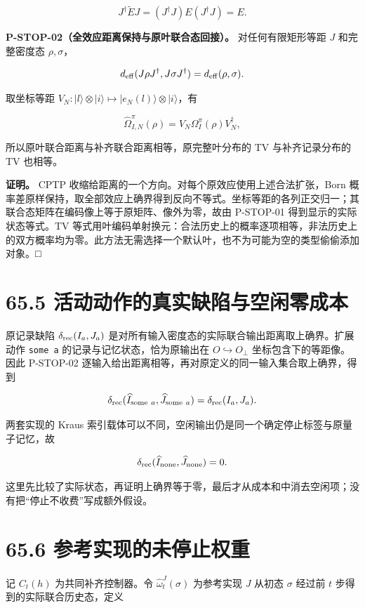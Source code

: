 \documentclass[
  11pt,
  oneside]{book}
\begin{document}
\[
J^\dagger\widetilde E J
=(J^\dagger J)E(J^\dagger J)=E.
\]

\protect\hypertarget{p-stop-02}{}{}

\textbf{P-STOP-02（全效应距离保持与原叶联合态回接）。}
对任何有限矩形等距 \(J\) 和完整密度态 \(\rho,\sigma\)，

\[
d_{\rm eff}(J\rho J^\dagger,J\sigma J^\dagger)
=d_{\rm eff}(\rho,\sigma).
\]

取坐标等距
\(V_N:|l\rangle\otimes|i\rangle\mapsto|e_N(l)\rangle\otimes|i\rangle\)，有

\[
\widehat\Omega_{I,N}^\pi(\rho)
=V_N\Omega_I^\pi(\rho)V_N^\dagger,
\]

所以原叶联合距离与补齐联合距离相等，原完整叶分布的 TV 与补齐记录分布的
TV 也相等。

\textbf{证明。} CPTP
收缩给距离的一个方向。对每个原效应使用上述合法扩张，Born
概率差原样保持，取全部效应上确界得到反向不等式。坐标等距的各列正交归一；其联合态矩阵在编码像上等于原矩阵、像外为零，故由
P-STOP-01 得到显示的实际状态等式。TV
等式用叶编码单射换元：合法历史上的概率逐项相等，非法历史上的双方概率均为零。此方法无需选择一个默认叶，也不为可能为空的类型偷偷添加对象。□

\section{65.5 活动动作的真实缺陷与空闲零成本}

原记录缺陷 \(\delta_{\rm rec}(I_a,J_a)\)
是对所有输入密度态的实际联合输出距离取上确界。扩展动作 \texttt{some\ a}
的记录与记忆状态，恰为原输出在 \(O\hookrightarrow O_\bot\)
坐标包含下的等距像。因此 P-STOP-02
逐输入给出距离相等，再对原定义的同一输入集合取上确界，得到

\[
\delta_{\rm rec}(\widehat I_{\mathrm{some}\ a},
\widehat J_{\mathrm{some}\ a})
=\delta_{\rm rec}(I_a,J_a).
\]

两套实现的 Kraus
索引载体可以不同，空闲输出仍是同一个确定停止标签与原量子记忆，故

\[
\delta_{\rm rec}(\widehat I_{\mathrm{none}},
\widehat J_{\mathrm{none}})=0.
\]

这里先比较了实际状态，再证明上确界等于零，最后才从成本和中消去空闲项；没有把``停止不收费''写成额外假设。

\section{65.6 参考实现的未停止权重}

记 \(C_t(h)\) 为共同补齐控制器。令 \(\widehat\omega_t^J(\sigma)\)
为参考实现 \(J\) 从初态 \(\sigma\) 经过前 \(t\)
步得到的实际联合历史态，定义
\end{document}
